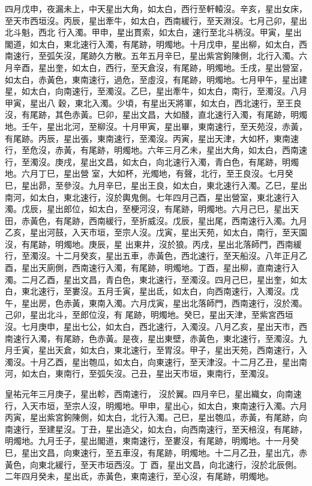\begin{pinyinscope}
 四月戊申，夜漏未上，中天星出大角，如太白，西行至軒轅沒。辛亥，星出女床，至天市西垣沒。丙辰，星出牽牛，如太白，西南緩行，至天淵沒。七月己卯，星出北斗魁，西北
 行入濁。甲申，星出貫索，如太白，速行至北斗柄沒。甲寅，星出閣道，如太白，東北速行入濁，有尾跡，明燭地。十月戊申，星出柳，如太白，西南速行，至弧矢沒，尾跡久方散。五年五月辛巳，星出紫宮鉤陳側，北行入濁。六月辛酉，星出奎，如太白，西行，至天倉沒，有尾跡，明燭地。壬戌，星出營室，如太白，赤黃色，東南速行，過危，至虛沒，有尾跡，明燭地。七月甲午，星出建星，如太白，向南速行，至濁沒。乙巳，星出牽牛，如太白，南行，至濁沒。八月甲寅，星出八
 穀，東北入濁。少頃，有星出天將軍，如太白，西北速行，至王良沒，有尾跡，其色赤黃。巳卯，星出文昌，大如醆，直北速行入濁，有尾跡，明燭地。壬午，星出北河，至柳沒。十月甲寅，星出畢，東南速行，至天苑沒，赤黃，有尾跡。丙辰，星出張，東南速行，至濁沒。丙寅，星出天津，大如杯，東南速行，至危沒，赤黃，有尾跡，明燭地。六年三月乙未，星出大角，如太白，西南速行，至濁沒。庚戌，星出文昌，如太白，向北速行入濁，青白色，有尾跡，明燭地。六月丁巳，星出營
 室，大如杯，光燭地，有聲，北行，至王良沒。七月癸巳，星出昴，至參沒。九月辛巳，星出王良，如太白，東北速行入濁。乙巳，星出南河，如太白，東北速行，沒於輿鬼側。七年四月己酉，星出營室，東北速行入濁。戊辰，星出郎位，如太白，至梗河沒，有尾跡，明燭地。六月己巳，星出天田，赤黃色，有尾跡，西南緩行，至折威沒。戊辰，星出尾，西南速行入濁。九月乙亥，星出河鼓，入天市垣，至宗人沒。戊寅，星出天苑，如太白，南行，至天園沒，有尾跡，明燭地。庚辰，星
 出東井，沒於狼。丙戌，星出北落師門，西南緩行，至濁沒。十二月癸亥，星出五車，赤黃色，西北速行，至天船沒。八年正月乙酉，星出天廁側，西南速行入濁，有尾跡，明燭地。丁酉，星出柳，直南速行入濁。二月乙酉，星出文昌，青白色，東北速行，至濁沒。四月己巳，星出奎，如太白，東北速行，至婁沒。五月壬寅，星出氐，如太白，向西南速行，入濁沒。戊午，星出房，色赤黃，東南入濁。六月戊寅，星出北落師門，西南速行，沒於濁。己卯，星出北斗，至郎位沒，有
 尾跡，明燭地。癸巳，星出天津，至紫宮西垣沒。七月庚申，星出七公，如太白，西北速行，入濁沒。八月乙亥，星出天市，西南速行入濁，有尾跡，色赤黃。是夜，星出東壁，赤黃色，東北速行，至濁沒。九月壬寅，星出天倉，如太白，東北速行，至胃沒。甲子，星出天苑，西南速行，入濁沒。十月乙酉，星出匏瓜，如太白，向東速行，至天津沒。十二月乙丑，星出南河，如太白，東南行，至弧矢沒。己丑，星出天市垣，東南行，至濁沒。



 皇祐元年三月庚子，星出軫，西南速行，
 沒於翼。四月辛巳，星出織女，向南速行，入天市垣，至宗人沒，明燭地。甲申，星出心，如太白，東南速行入濁。六月丙寅，星出紫宮鉤陳側，如太白，北行入濁。己巳，星出匏瓜，赤黃，有尾跡，向南速行，至建星沒。丁丑，星出造父，如太白，向西南速行，至天棓沒，有尾跡，明燭地。九月壬子，星出閣道，東南速行，至婁沒，有尾跡，明燭地。十一月癸巳，星出文昌，向東速行，至五車沒，有尾跡，明燭地。十二月乙丑，星出亢，赤黃色，向東北緩行，至天市垣西沒。丁
 酉，星出文昌，向北速行，沒於北辰側。二年四月癸未，星出氐，赤黃色，東南速行，至心沒，有尾跡，明燭地。




\end{pinyinscope}
